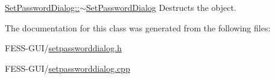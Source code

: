 \hyperlink{class_set_password_dialog_ae3dec5f6c8b27800757c928e7e61468c}{Set\+Password\+Dialog\+::$\sim$\+Set\+Password\+Dialog} Destructs the object. 



The documentation for this class was generated from the following files\+:\begin{DoxyCompactItemize}
\item 
F\+E\+S\+S-\/\+G\+U\+I/\hyperlink{setpassworddialog_8h}{setpassworddialog.\+h}\item 
F\+E\+S\+S-\/\+G\+U\+I/\hyperlink{setpassworddialog_8cpp}{setpassworddialog.\+cpp}\end{DoxyCompactItemize}
